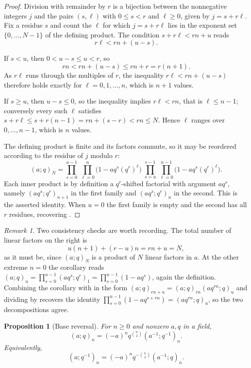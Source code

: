\documentclass[11pt,a4paper,oneside,openany]{book}
\newtheorem{proposition}[proposition]{Proposition}
\theoremstyle{definition}
\theoremstyle{remark}
\newtheorem{remark}[remark]{Remark}
\begin{document}
\begin{proof}
Division with remainder by $r$ is a bijection between the nonnegative integers $j$ and the pairs $(s,\ell)$ with $0\le s<r$ and $\ell\ge0$, given by $j=s+r\ell$.  Fix a residue $s$ and count the $\ell$ for which $j=s+r\ell$ lies in the exponent set $\{0,\ldots,N-1\}$ of the defining product.  The condition $s+r\ell<rn+u$ reads
\[
 r\ell<rn+(u-s).
\]

If $s<u$, then $0<u-s\le u<r$, so
\[
 rn<rn+(u-s)\le rn+r=r(n+1).
\]
As $r\ell$ runs through the multiples of $r$, the inequality $r\ell<rn+(u-s)$ therefore holds exactly for $\ell=0,1,\ldots,n$, which is $n+1$ values.

If $s\ge u$, then $u-s\le0$, so the inequality implies $r\ell<rn$, that is $\ell\le n-1$; conversely every such $\ell$ satisfies $s+r\ell\le s+r(n-1)=rn+(s-r)<rn\le N$.  Hence $\ell$ ranges over $0,\ldots,n-1$, which is $n$ values.

The defining product is finite and its factors commute, so it may be reordered according to the residue of $j$ modulo $r$:
\[
 (a;q)_N
 =\prod_{s=0}^{u-1}\ \prod_{\ell=0}^{n}\bigl(1-aq^{s}(q^{r})^{\ell}\bigr)\;
  \prod_{s=u}^{r-1}\ \prod_{\ell=0}^{n-1}\bigl(1-aq^{s}(q^{r})^{\ell}\bigr).
\]
Each inner product is by definition a $q^r$-shifted factorial with argument $aq^s$, namely $(aq^s;q^r)_{n+1}$ in the first family and $(aq^s;q^r)_n$ in the second.  This is the asserted identity.  When $u=0$ the first family is empty and the second has all $r$ residues, recovering .
\end{proof}

\begin{remark}\label{rem:dissection-remainder-checks}
Two consistency checks are worth recording.  The total number of linear factors on the right is
\[
 u(n+1)+(r-u)n=rn+u=N,
\]
as it must be, since $(a;q)_N$ is a product of $N$ linear factors in $a$.  At the other extreme $n=0$ the corollary reads $(a;q)_u=\prod_{s=0}^{u-1}(aq^s;q^r)_1=\prod_{s=0}^{u-1}(1-aq^s)$, again the definition.  Combining the corollary with  in the form $(a;q)_{rn+u}=(a;q)_{rn}(aq^{rn};q)_u$ and dividing by  recovers the identity $\prod_{s=0}^{u-1}(1-aq^{s+rn})=(aq^{rn};q)_u$, so the two decompositions agree.
\end{remark}

\begin{proposition}[Base reversal]\label{prop:base-reversal}
For $n\ge0$ and nonzero $a,q$ in a field,
\[
 (a;q)_n=(-a)^n q^{\binom n2}(a^{-1};q^{-1})_n.
\]
Equivalently,
\[
 (a;q^{-1})_n=(-a)^nq^{-\binom n2}(a^{-1};q)_n.
\]
\end{proposition}
\end{document}
